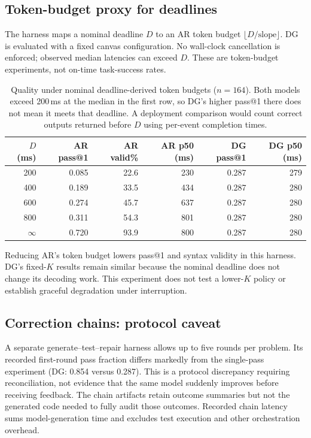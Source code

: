 \subsection{Token-budget proxy for deadlines}

The harness maps a nominal deadline $D$ to an AR token budget
$\lfloor D/\text{slope}\rfloor$. DG is evaluated with a fixed canvas
configuration. No wall-clock cancellation is enforced; observed median
latencies can exceed $D$. These are token-budget experiments, not
on-time task-success rates.

\begin{table}[h]
\centering
\caption{Quality under nominal deadline-derived token budgets
($n{=}164$). Both models exceed 200\,ms at the median in the first
row, so DG's higher pass@1 there does not mean it meets that deadline.
A deployment comparison would count correct outputs returned before $D$
using per-event completion times.}
\label{tab:deadline}
\begin{tabular}{@{}rrrrrr@{}}
\toprule
$D$ (ms) & AR pass@1 & AR valid\% & AR p50 (ms) & DG pass@1 & DG p50 (ms) \\
\midrule
200  & 0.085 & 22.6 & 230 & 0.287 & 279 \\
400  & 0.189 & 33.5 & 434 & 0.287 & 280 \\
600  & 0.274 & 45.7 & 637 & 0.287 & 280 \\
800  & 0.311 & 54.3 & 801 & 0.287 & 280 \\
$\infty$ & 0.720 & 93.9 & 800 & 0.287 & 280 \\
\bottomrule
\end{tabular}
\end{table}

Reducing AR's token budget lowers pass@1 and syntax validity in
this harness. DG's fixed-$K$ results remain similar because the nominal
deadline does not change its decoding work. This experiment does not test
a lower-$K$ policy or establish graceful degradation under interruption.

\subsection{Correction chains: protocol caveat}

A separate generate--test--repair harness allows up to five rounds
per problem. Its recorded first-round pass fraction differs markedly
from the single-pass experiment (DG: 0.854 versus 0.287). This is a
protocol discrepancy requiring reconciliation, not evidence that the
same model suddenly improves before receiving feedback. The chain
artifacts retain outcome summaries but not the generated code needed to
fully audit those outcomes. Recorded chain latency sums model-generation
time and excludes test execution and other orchestration overhead.

